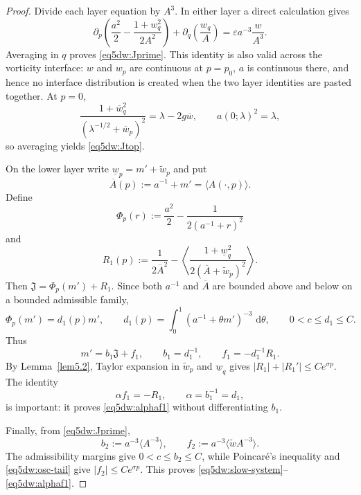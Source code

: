 \documentclass[11pt,reqno]{amsart}
\numberwithin{equation}{section}
\newcommand{\dd}{\,\mathrm{d}}
\theoremstyle{definition}
\theoremstyle{remark}
\begin{document}
\begin{proof}
Divide each layer equation by $A^3$.  In either layer a direct calculation gives
\[
 \partial_p\!\left(
   \frac{a^2}{2}-\frac{1+w_q^2}{2A^2}\right)
 +\partial_q\!\left(\frac{w_q}{A}\right)
 =\varepsilon a^{-3}\frac{w}{A^3}.
\]
Averaging in $q$ proves \eqref{eq5dw:Jprime}.  This identity is also
valid across the vorticity interface: $w$ and $w_p$ are continuous at
$p=p_0$, $a$ is continuous there, and hence no interface distribution is
created when the two layer identities are pasted together.  At $p=0$,
\[
 \frac{1+\overline w_q^2}{(\lambda^{-1/2}+\overline w_p)^2}
 =\lambda-2g\overline w,
 \qquad a(0;\lambda)^2=\lambda,
\]
so averaging yields \eqref{eq5dw:Jtop}.

On the lower layer write $\underline w_p=m'+\widetilde w_p$ and put
\[
 \overline A(p):=a^{-1}+m'=\langle A(\cdot,p)\rangle.
\]
Define
\[
 \Phi_p(r):=\frac{a^2}{2}-\frac1{2(a^{-1}+r)^2}
\]
and
\[
 R_1(p):=\frac1{2\overline A^2}
 -\left\langle
   \frac{1+\underline w_q^2}{2(\overline A+\widetilde w_p)^2}
  \right\rangle.
\]
Then $\mathfrak J=\Phi_p(m')+R_1$.  Since both
$a^{-1}$ and $\overline A$ are bounded above and below on a bounded
admissible family,
\[
 \Phi_p(m')=d_1(p)m',\qquad
 d_1(p)=\int_0^1(a^{-1}+\theta m')^{-3}\,\dd\theta,
 \qquad 0<c\le d_1\le C.
\]
Thus
\[
 m'=b_1\mathfrak J+f_1,
 \qquad b_1=d_1^{-1},\qquad f_1=-d_1^{-1}R_1.
\]
By Lemma~\ref{lem5.2}, Taylor expansion in $\widetilde w_p$ and
$\underline w_q$ gives
$|R_1|+|R_1'|\le Ce^{\sigma p}$.  The identity
\[
 \alpha f_1=-R_1,\qquad \alpha=b_1^{-1}=d_1,
\]
is important: it proves \eqref{eq5dw:alphaf1} without differentiating
$b_1$.

Finally, from \eqref{eq5dw:Jprime},
\[
 b_2:=a^{-3}\langle A^{-3}\rangle,
 \qquad
 f_2:=a^{-3}\langle\widetilde w A^{-3}\rangle.
\]
The admissibility margins give $0<c\le b_2\le C$, while
Poincar\'e's inequality and \eqref{eq5dw:osc-tail} give
$|f_2|\le Ce^{\sigma p}$.  This proves \eqref{eq5dw:slow-system}--
\eqref{eq5dw:alphaf1}.
\end{proof}
\end{document}
